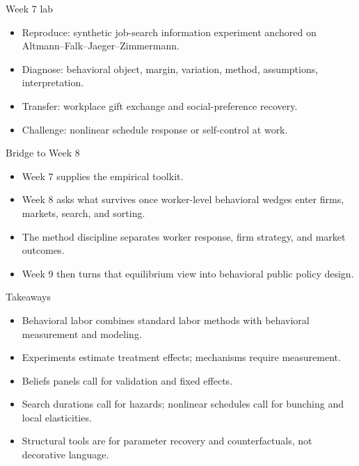 \documentclass[aspectratio=169,11pt]{beamer}
\begin{document}
\begin{frame}{Week 7 lab}
\begin{itemize}
    \item Reproduce: synthetic job-search information experiment anchored on Altmann--Falk--Jaeger--Zimmermann.
    \item Diagnose: behavioral object, margin, variation, method, assumptions, interpretation.
    \item Transfer: workplace gift exchange and social-preference recovery.
    \item Challenge: nonlinear schedule response or self-control at work.
\end{itemize}
\end{frame}

\begin{frame}{Bridge to Week 8}
\begin{itemize}
    \item Week 7 supplies the empirical toolkit.
    \item Week 8 asks what survives once worker-level behavioral wedges enter firms, markets, search, and sorting.
    \item The method discipline separates worker response, firm strategy, and market outcomes.
    \item Week 9 then turns that equilibrium view into behavioral public policy design.
\end{itemize}
\end{frame}

\begin{frame}{Takeaways}
\begin{itemize}
    \item Behavioral labor combines standard labor methods with behavioral measurement and modeling.
    \item Experiments estimate treatment effects; mechanisms require measurement.
    \item Beliefs panels call for validation and fixed effects.
    \item Search durations call for hazards; nonlinear schedules call for bunching and local elasticities.
    \item Structural tools are for parameter recovery and counterfactuals, not decorative language.
\end{itemize}
\end{frame}
\end{document}
